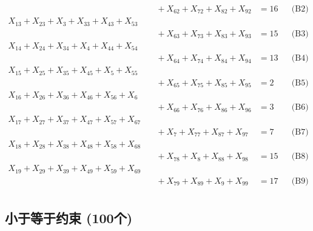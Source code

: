 \documentclass[a4paper,10pt]{article}
\begin{document}
{\begin{align}
&\quad  + X_{62} + X_{72} + X_{82} + X_{92} &= 16 && \text{(B2)} \\
X_{13} + X_{23} + X_{3} + X_{33} + X_{43} + X_{53} \\[0.5ex]
&\quad  + X_{63} + X_{73} + X_{83} + X_{93} &= 15 && \text{(B3)} \\
X_{14} + X_{24} + X_{34} + X_{4} + X_{44} + X_{54} \\[0.5ex]
&\quad  + X_{64} + X_{74} + X_{84} + X_{94} &= 13 && \text{(B4)} \\
X_{15} + X_{25} + X_{35} + X_{45} + X_{5} + X_{55} \\[0.5ex]
&\quad  + X_{65} + X_{75} + X_{85} + X_{95} &= 2 && \text{(B5)} \\
X_{16} + X_{26} + X_{36} + X_{46} + X_{56} + X_{6} \\[0.5ex]
&\quad  + X_{66} + X_{76} + X_{86} + X_{96} &= 3 && \text{(B6)} \\
X_{17} + X_{27} + X_{37} + X_{47} + X_{57} + X_{67} \\[0.5ex]
&\quad  + X_{7} + X_{77} + X_{87} + X_{97} &= 7 && \text{(B7)} \\
X_{18} + X_{28} + X_{38} + X_{48} + X_{58} + X_{68} \\[0.5ex]
&\quad  + X_{78} + X_{8} + X_{88} + X_{98} &= 15 && \text{(B8)} \\
X_{19} + X_{29} + X_{39} + X_{49} + X_{59} + X_{69} \\[0.5ex]
&\quad  + X_{79} + X_{89} + X_{9} + X_{99} &= 17 && \text{(B9)} \\
\allowbreak
\end{align}}

\subsection{小于等于约束 (100个)}
\end{document}
